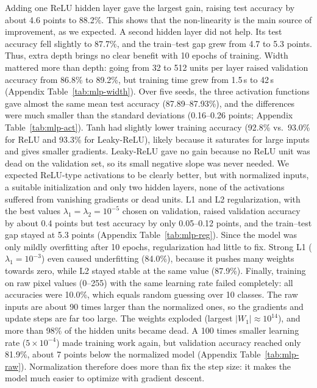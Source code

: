 \documentclass[11pt]{article}
\begin{document}
Adding one ReLU hidden layer gave the largest gain, raising test accuracy by about 4.6 points to 88.2\%. This shows that the non-linearity is the main source of improvement, as we expected.
A second hidden layer did not help. Its test accuracy fell slightly to 87.7\%, and the train--test gap grew from 4.7 to 5.3 points. Thus, extra depth brings no clear benefit with 10 epochs of training.
Width mattered more than depth: going from 32 to 512 units per layer raised validation accuracy
from 86.8\% to 89.2\%, but training time grew from 1.5\,s to 42\,s (Appendix Table~\ref{tab:mlp-width}).
Over five seeds, the three activation functions gave almost the same mean test accuracy
(87.89--87.93\%), and the differences were much smaller than the standard deviations
(0.16--0.26 points; Appendix Table~\ref{tab:mlp-act}).
Tanh had slightly lower training accuracy (92.8\% vs.\ 93.0\% for ReLU and 93.3\% for Leaky-ReLU),
likely because it saturates for large inputs and gives smaller gradients.
Leaky-ReLU gave no gain because no ReLU unit was dead on the validation set, so its small negative
slope was never needed.
We expected ReLU-type activations to be clearly better, but with normalized inputs, a suitable
initialization and only two hidden layers, none of the activations suffered from vanishing gradients
or dead units.
L1 and L2 regularization, with the best values $\lambda_1 = \lambda_2 = 10^{-5}$ chosen on validation,
raised validation accuracy by about 0.4 points but test accuracy by only 0.05--0.12 points,
and the train--test gap stayed at 5.3 points (Appendix Table~\ref{tab:mlp-reg}).
Since the model was only mildly overfitting after 10 epochs, regularization had little to fix.
Strong L1 ($\lambda_1 = 10^{-3}$) even caused underfitting (84.0\%), because it pushes many weights
towards zero, while L2 stayed stable at the same value (87.9\%).
Finally, training on raw pixel values (0--255) with the same learning rate failed completely:
all accuracies were 10.0\%, which equals random guessing over 10 classes.
The raw inputs are about 90 times larger than the normalized ones, so the gradients and update steps
are far too large. The weights exploded (largest $|W_1| \approx 10^{14}$), and more than 98\% of the
hidden units became dead.
A 100 times smaller learning rate ($5\times10^{-4}$) made training work again, but validation accuracy
reached only 81.9\%, about 7 points below the normalized model (Appendix Table~\ref{tab:mlp-raw}).
Normalization therefore does more than fix the step size: it makes the model much easier to optimize
with gradient descent.
\end{document}
